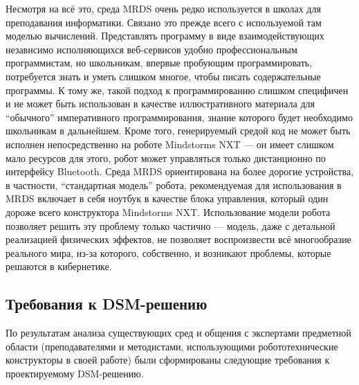 Несмотря на всё это, среда MRDS очень редко используется в школах для преподавания 
информатики. Связано это прежде всего с используемой там моделью вычислений. Представлять 
программу в виде взаимодействующих независимо исполняющихся веб-сервисов удобно профессиональным 
программистам, но школьникам, впервые пробующим программировать, потребуется знать и 
уметь слишком многое, чтобы писать содержательные программы. К тому же, такой подход к 
программированию слишком специфичен и не может быть использован в качестве иллюстративного 
материала для "`обычного"' императивного программирования, знание которого будет необходимо 
школьникам в дальнейшем. Кроме того, генерируемый средой код не может быть исполнен 
непосредственно на роботе Mindstorms NXT --- он имеет слишком мало ресурсов для этого, 
робот может управляться только дистанционно по интерфейсу Bluetooth. Среда MRDS ориентирована 
на более дорогие устройства, в частности, "`стандартная модель"' робота, рекомендуемая 
для использования в MRDS включает в себя ноутбук в качестве блока управления, который 
один дороже всего конструктора Mindstorms NXT. Использование модели робота позволяет 
решить эту проблему только частично --- модель, даже с детальной реализацией физических 
эффектов, не позволяет воспроизвести всё многообразие реального мира, из-за которого, 
собственно, и возникают проблемы, которые решаются в кибернетике.

\subsection{Требования к DSM-решению}
По результатам анализа существующих сред и общения с экспертами предметной области 
(преподавателями и методистами, использующими робототехнические конструкторы в своей работе) 
были сформированы следующие требования к проектируемому \ac{DSM}-решению.

